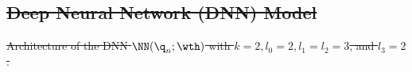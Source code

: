 \documentclass[letterpaper, journal]{IEEEtran}
\providecommand{\DIFdel}[1]{{\protect\color{red}\sout{#1}}} %
\providecommand{\DIFdelFL}[1]{\DIFdel{#1}} %
\begin{document}
\subsection{\DIFdel{Deep Neural Network (DNN) Model}}%
\addtocounter{subsection}{-1}%

{%
\DIFdelFL{Architecture of the DNN $\NN({\q}_n;\wth)$ with $k=2,l_0=2,l_1=l_2=3$, and $l_3=2$.
    }}
\end{document}

